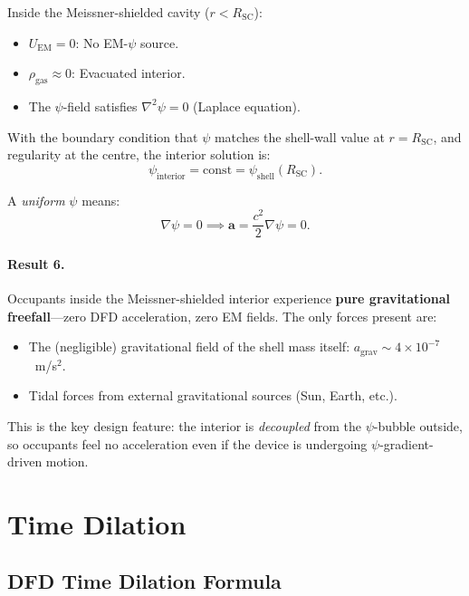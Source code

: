 \documentclass[amsmath,amssymb,aps,prd,superscriptaddress,nofootinbib]{revtex4-2}
\newcommand{\avec}{\mathbf{a}}
\begin{document}
Inside the Meissner-shielded cavity ($r < R_\text{SC}$):
\begin{itemize}
\item $U_\text{EM} = 0$: No EM-$\psi$ source.
\item $\rho_\text{gas} \approx 0$: Evacuated interior.
\item The $\psi$-field satisfies $\nabla^2 \psi = 0$ (Laplace equation).
\end{itemize}

With the boundary condition that $\psi$ matches the shell-wall value
at $r = R_\text{SC}$, and regularity at the centre, the interior
solution is:
\begin{equation}
\psi_\text{interior} = \text{const} = \psi_\text{shell}(R_\text{SC}).
\end{equation}

A \emph{uniform} $\psi$ means:
\begin{equation}
\nabla\psi = 0 \implies \avec = \frac{c^2}{2}\nabla\psi = 0.
\end{equation}

\paragraph{Result 6.} Occupants inside the Meissner-shielded interior
experience \textbf{pure gravitational freefall}---zero DFD acceleration,
zero EM fields. The only forces present are:
\begin{itemize}
\item The (negligible) gravitational field of the shell mass itself:
  $a_\text{grav} \sim 4 \times 10^{-7}$~m/s$^2$.
\item Tidal forces from external gravitational sources (Sun, Earth, etc.).
\end{itemize}

This is the key design feature: the interior is \emph{decoupled} from
the $\psi$-bubble outside, so occupants feel no acceleration even if
the device is undergoing $\psi$-gradient-driven motion.

\section{Time Dilation}\label{sec:time-dilation}

\subsection{DFD Time Dilation Formula}
\end{document}
